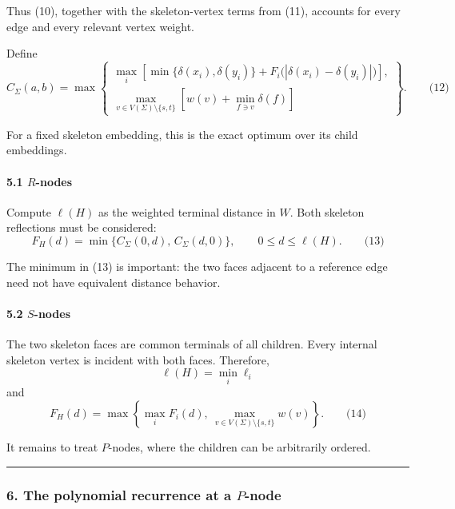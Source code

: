 \documentclass[
  11pt,
  a4paper,
]{article}
\begin{document}
Thus (10), together with the skeleton-vertex terms from (11), accounts
for every edge and every relevant vertex weight.

Define \[
C_\Sigma(a,b)
=
\max\left\{
\begin{array}{l}
\displaystyle
\max_i\left[
\min\{\delta(x_i),\delta(y_i)\}
+
F_i\bigl(|\delta(x_i)-\delta(y_i)|\bigr)
\right],
\\[2ex]
\displaystyle
\max_{v\in V(\Sigma)\setminus\{s,t\}}
\left[
w(v)+\min_{f\ni v}\delta(f)
\right]
\end{array}
\right\}.
\qquad\text{(12)}
\]

For a fixed skeleton embedding, this is the exact optimum over its child
embeddings.

\paragraph{\texorpdfstring{5.1 \(R\)-nodes}{5.1 R-nodes}}\label{r-nodes}

Compute \(\ell(H)\) as the weighted terminal distance in \(W\). Both
skeleton reflections must be considered: \[
F_H(d)=
\min\{C_\Sigma(0,d),\,C_\Sigma(d,0)\},
\qquad 0\le d\le \ell(H).
\qquad\text{(13)}
\]

The minimum in (13) is important: the two faces adjacent to a reference
edge need not have equivalent distance behavior.

\paragraph{\texorpdfstring{5.2 \(S\)-nodes}{5.2 S-nodes}}\label{s-nodes}

The two skeleton faces are common terminals of all children. Every
internal skeleton vertex is incident with both faces. Therefore, \[
\ell(H)=\min_i\ell_i
\] and \[
F_H(d)
=
\max\left\{
\max_i F_i(d),\
\max_{v\in V(\Sigma)\setminus\{s,t\}}w(v)
\right\}.
\qquad\text{(14)}
\]

It remains to treat \(P\)-nodes, where the children can be arbitrarily
ordered.

\begin{center}\rule{0.5\linewidth}{0.5pt}\end{center}

\subsubsection{\texorpdfstring{6. The polynomial recurrence at a
\(P\)-node}{6. The polynomial recurrence at a P-node}}\label{the-polynomial-recurrence-at-a-p-node}
\end{document}
